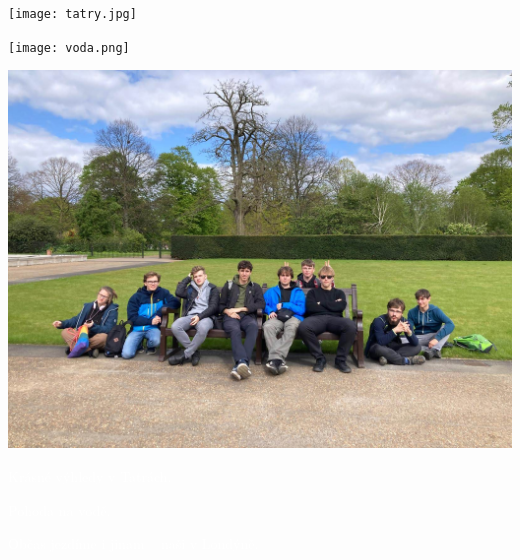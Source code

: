 \documentclass[a5paper, twoside]{article}
\begin{document}
\begin{redbox}
	\begin{minipage}{0.32\linewidth}
		\texttt{[image: tatry.jpg]}
	\end{minipage}
	\hfill
	\begin{minipage}{0.32\linewidth}
		\texttt{[image: voda.png]}
	\end{minipage}
	\hfill
	\begin{minipage}{0.32\linewidth}
		\includegraphics[width=\linewidth]{londyn.jpg}
	\end{minipage}
  \par
  \vspace{0.5em}
  \noindent
  \begin{minipage}{0.32\linewidth}
    \centering \textcolor{white}{Krásné výhledy v Tatrách.}
	\end{minipage}
	\hfill
	\begin{minipage}{0.32\linewidth}
    \centering \textcolor{white}{Pohoda na vodě.}
	\end{minipage}
	\hfill
	\begin{minipage}{0.32\linewidth}
    \centering \textcolor{white}{Občas jezdíme i jinam -- naši v Londýně.}
	\end{minipage}
\end{redbox}
\end{document}
